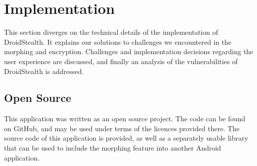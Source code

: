 \section{Implementation}
\label{sec:implementation}

This section diverges on the technical details of the implementation of DroidStealth.
It explains our solutions to challenges we encountered in the morphing and encryption.
Challenges and implementation decisions regarding the user experience are discussed, and finally an analysis of the vulnerabilities of DroidStealth is addressed.











\subsection{Open Source}
This application was written as an open source project.
The code can be found on GitHub\cite{githubSource}, and may be used under terms of the licences provided there.
The source code of this application is provided, as well as a separately usable library that can be used to include the morphing feature into another Android application.
